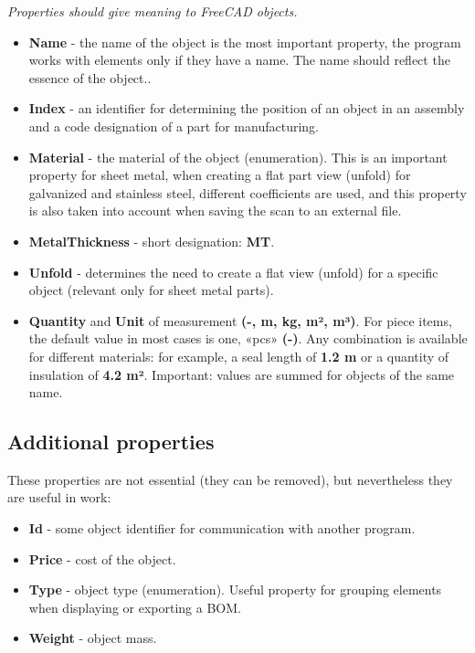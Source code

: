 \documentclass[a4paper,12pt]{article}
\begin{document}
\begin{center}\emph{Properties should give meaning to FreeCAD objects.}\end{center}

\begin{itemize}
	\item \textbf{Name} - the name of the object is the most important property, the program works with elements only if they have a name. The name should reflect the essence of the object..
	\item \textbf{Index} - an identifier for determining the position of an object in an assembly and a code designation of a part for manufacturing.
	\item \textbf{Material} - the material of the object (enumeration). This is an important property for sheet metal, when creating a flat part view (unfold) for galvanized and stainless steel, different coefficients are used, and this property is also taken into account when saving the scan to an external file.
	\item \textbf{MetalThickness} - short designation: \textbf{MT}.
	\item \textbf{Unfold} - determines the need to create a flat view (unfold) for a specific object (relevant only for sheet metal parts).
	\item \textbf{Quantity} and \textbf{Unit} of measurement \textbf{(-, m, kg, m², m³)}. For piece items, the default value in most cases is one, «pcs» \textbf{(-)}. Any combination is available for different materials: for example, a seal length of \textbf{1.2 m} or a quantity of insulation of \textbf{4.2 m²}. Important: values ​​are summed for objects of the same name.
\end{itemize}

\pagebreak

\subsection{Additional properties}
These properties are not essential (they can be removed), but nevertheless they are useful in work:

\begin{itemize}
	\item \textbf{Id} - some object identifier for communication with another program.
	\item \textbf{Price} - cost of the object.
	\item \textbf{Type} - object type (enumeration). Useful property for grouping elements when displaying or exporting a BOM.
	\item \textbf{Weight} - object mass.
\end{itemize}
\end{document}
